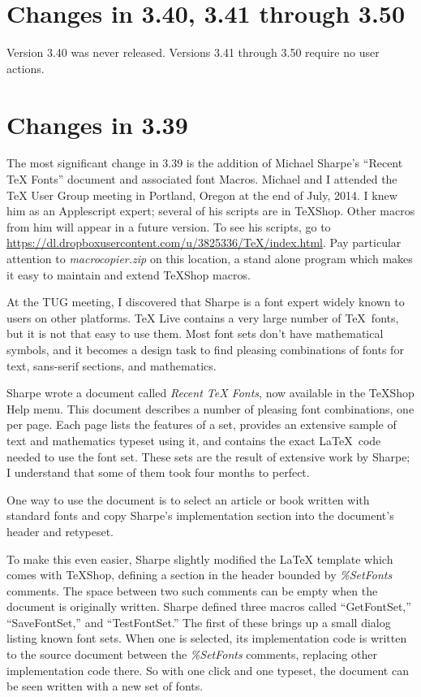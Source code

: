 \documentclass[11pt, oneside]{amsart}
\begin{document}
\section{Changes in 3.40, 3.41 through 3.50}

Version 3.40 was never released. Versions 3.41 through 3.50 require no user actions.

\section{Changes in 3.39}

The most significant change in 3.39 is the addition of Michael Sharpe's ``Recent TeX Fonts'' document and associated font Macros.  Michael and I attended the TeX User Group meeting in Portland, Oregon at the end of July, 2014. I knew him as an Applescript expert; several of his scripts are in TeXShop. Other macros from him will appear in a future version. To see his scripts, go to 
\url{https://dl.dropboxusercontent.com/u/3825336/TeX/index.html}. Pay particular attention to 
{\em macrocopier.zip} on this location, a stand alone program which makes it easy to maintain and extend TeXShop macros.

At the TUG meeting, I discovered that Sharpe is a font expert widely known to users on other platforms.
TeX Live contains a very large number of \TeX\ fonts, but it is not that easy to use them.
Most font sets don't have mathematical symbols, and it becomes a design task to find pleasing combinations of fonts for text, sans-serif sections, and mathematics.

Sharpe wrote a document called {\em Recent TeX Fonts}, now available in the TeXShop Help menu. This document describes a number of pleasing font combinations, one per page. Each page lists the features of a set, provides an extensive sample of text and mathematics typeset using
it, and contains the exact La\TeX\ code needed to use the font set. These sets are the result
of extensive work by Sharpe; I understand that some of them took four months to perfect.

One way to use the document is to select an article or book written with standard fonts and  copy Sharpe's implementation section into the document's header and retypeset. 

To make this even easier, Sharpe slightly modified the LaTeX template which comes with TeXShop, 
defining a  section in the header bounded by {\em \%SetFonts} comments. The space between two such comments can be empty when the document is originally written.  Sharpe defined three
macros called ``GetFontSet,'' ``SaveFontSet,'' and ``TestFontSet.'' The first of these brings up
a small dialog listing known font sets. When one is selected, its implementation code is written to the source document between the {\em \%SetFonts} comments, replacing other implementation code there. So with one click and one typeset, the document can be seen written with a new set of fonts.
\end{document}
